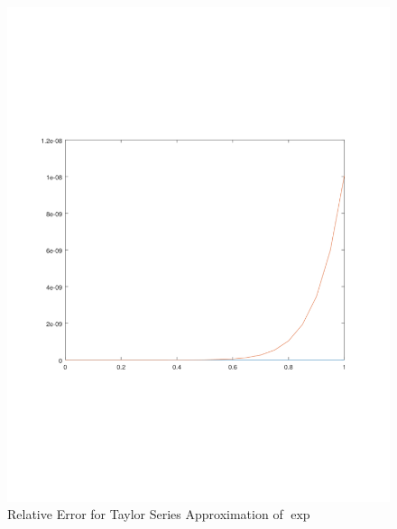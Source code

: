 \documentclass[11pt,a4paper,dvipsnames,twosided]{article}
\theoremstyle{definition}
\theoremstyle{definition}
\begin{document}
\begin{figure}[ht]
  \centering
    \includegraphics[width=\textwidth]{taylor_exp}
  \caption{Relative Error for Taylor Series Approximation of  $\exp$}
  \label{fig:exp-approx-taylor}
\end{figure}
\end{document}
